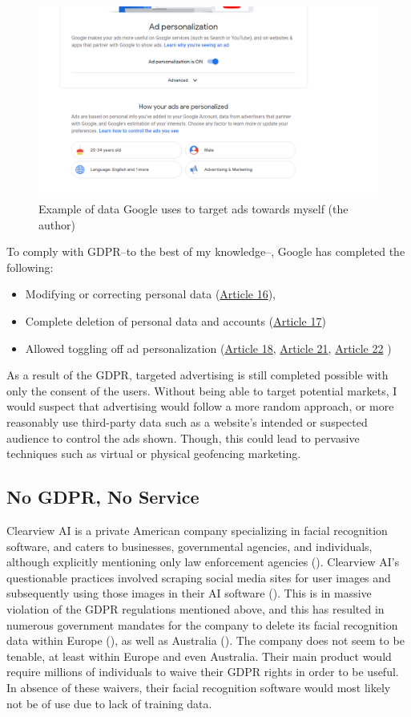 \documentclass[
	letterpaper, %
]{jdf}
\begin{document}
\begin{figure}
	\centering
	\includegraphics[width=0.7\linewidth]{../figures/google-ads}
	\caption{Example of data Google uses to target ads towards myself (the author)}
	\label{fig:google-ads}
\end{figure}


To comply with GDPR--to the best of my knowledge--, Google has completed the following:
\begin{itemize}
	\item Modifying or correcting personal data (\href{https://gdpr-info.eu/art-16-gdpr/}{Article 16}),
	\item Complete deletion of personal data and accounts (\href{https://gdpr-info.eu/art-17-gdpr/}{Article 17})
	\item Allowed toggling off ad personalization (\href{https://gdpr-info.eu/art-18-gdpr/}{Article 18},  \href{https://gdpr-info.eu/art-21-gdpr/}{Article 21}, \href{https://gdpr-info.eu/art-22-gdpr/}{Article 22} )
\end{itemize}
As a result of the GDPR, targeted advertising is still completed possible with only the consent of the users. Without being able to target potential markets, I would suspect that advertising would follow a more random approach, or more reasonably use third-party data such as a website's intended or suspected audience to control the ads shown. Though, this could lead to pervasive techniques such as virtual or physical geofencing marketing.

\subsection{No GDPR, No Service}
Clearview AI is a private American company specializing in facial recognition software, and caters to businesses, governmental agencies, and individuals, although explicitly mentioning only law enforcement agencies (\cite{g2e}).   
Clearview AI's questionable practices involved scraping social media sites for user images and subsequently using those images in their AI software (\cite{hill_secretive_2020}). This is in massive violation of the GDPR regulations mentioned above, and this has resulted in numerous government mandates for the company to delete its facial recognition data within Europe (\cite{brandom_french_2021}), as well as Australia (\cite{australia}). The company does not seem to be tenable, at least within Europe and even Australia. Their main product would require millions of individuals to waive their GDPR rights in order to be useful. In absence of these waivers, their facial recognition software would most likely not be of use due to lack of training data. 
\pagebreak
\printbibliography
\end{document}
